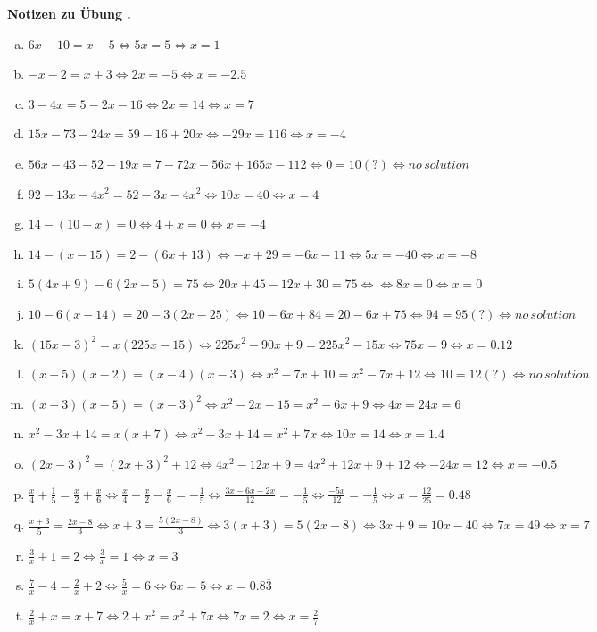 \documentclass[%
11pt,%
twoside,%
titlepage,%
swissgerman,%
headsepline%
]{scrartcl}
\newcommand{\faReturnGray}{\textcolor{gray}{\faMailReply}} %
\theoremstyle{definition}
\theoremstyle{plain}
\newcommand{\concatueb}[1]{ueb:#1}%
\newcommand{\concatlsg}[1]{lsg:#1}%
\newcounter{uebcounter}[section]
\renewcommand{\theuebcounter}{\thesection.\arabic{uebcounter}}  %
\newenvironment{lsg}[1]{%
	\par\noindent\textbf{Notizen zu Übung \theuebcounter\label{\concatlsg{#1}}}
	\hfill\hyperref[\concatueb{#1}]{\faReturnGray}\par %
}{%
	\par%
}
\begin{document}
\begin{lsg}{lineareglagogo}
		\begin{enumerate}[a)]
			\item $6x-10=x-5 \Leftrightarrow 5x=5 \Leftrightarrow x={1}$
			\item $-x-2=x+3 \Leftrightarrow 2x=-5 \Leftrightarrow x={-2.5}$
			\item $3-4x=5-2x-16 \Leftrightarrow 2x=14 \Leftrightarrow x={7}$
			\item $15x-73-24x=59-16+20x  \Leftrightarrow -29x=116  \Leftrightarrow x={-4}$
			\item $56x-43-52-19x=7-72x-56x+165x-112  \Leftrightarrow 0 = 10 (?)\Leftrightarrow {no\, solution}$
			\item $92-13x-4x^2=52-3x-4x^2 \Leftrightarrow 10x=40\Leftrightarrow x={4}$
			\item $14-(10-x)=0 \Leftrightarrow 4+x=0 \Leftrightarrow x={-4} $
			\item $14-(x-15)=2-(6x+13) \Leftrightarrow -x+29= -6x-11 \Leftrightarrow 5x = -40 \Leftrightarrow x={-8}$
			\item $5(4x+9)-6(2x-5)=75 \Leftrightarrow 20x+45 -12x+30 = 75 \Leftrightarrow \Leftrightarrow 8x=0 \Leftrightarrow x={0}$
			\item $10-6(x-14)=20-3(2x-25) \Leftrightarrow 10-6x+84 = 20-6x+75 \Leftrightarrow 94=95(?) \Leftrightarrow {no \, solution}$
			\item $(15x-3)^2=x(225x-15) \Leftrightarrow 225x^2-90x+9 = 225x^2-15x \Leftrightarrow 75x = 9 \Leftrightarrow x={0.12}$
			\item $(x-5)(x-2)=(x-4)(x-3)\Leftrightarrow x^2-7x+10 = x^2-7x+12 \Leftrightarrow 10=12(?) \Leftrightarrow {no \, solution}$
			\item $(x+3)(x-5)=(x-3)^2\Leftrightarrow x^2-2x-15 = x^2-6x+9 \Leftrightarrow 4x=24  x={6}$
			\item $x^2-3x+14=x(x+7)\Leftrightarrow x^2-3x+14=x^2+7x \Leftrightarrow 10x=14 \Leftrightarrow x={1.4}$
			\item $(2x-3)^2=(2x+3)^2+12\Leftrightarrow 4x^2 -12x+9 = 4x^2+12x+9+12\Leftrightarrow -24x=12 \Leftrightarrow x={-0.5}$
			\item $\frac{x}{4}+\frac{1}{5}=\frac{x}{2}+\frac{x}{6}\Leftrightarrow \frac{x}{4}-\frac{x}{2}-\frac{x}{6} = -\frac{1}{5} \Leftrightarrow  \frac{3x-6x-2x}{12}=-\frac{1}{5} \Leftrightarrow \frac{-5x}{12}=-\frac{1}{5}\Leftrightarrow x=\frac{12}{25}={0.48}$
			\item $\frac{x+3}{5}=\frac{2x-8}{3}\Leftrightarrow x+3 = \frac{5(2x-8)}{3}\Leftrightarrow 3(x+3)=5(2x-8) \Leftrightarrow 3x+9=10x-40 \Leftrightarrow 7x=49 \Leftrightarrow x={7}$
			\item $\frac{3}{x}+1 = 2\Leftrightarrow \frac{3}{x}=1\Leftrightarrow x={3}$
			\item $\frac{7}{x}-4 = \frac{2}{x}+2\Leftrightarrow \frac{5}{x}=6 \Leftrightarrow 6x=5 \Leftrightarrow x={0.8\overline{3}}$
			\item $\frac{2}{x}+x = x+7\Leftrightarrow 2+x^2 = x^2+7x \Leftrightarrow 7x=2 \Leftrightarrow x={\frac{2}{7}}$  
		\end{enumerate}
	\end{lsg}
\end{document}
